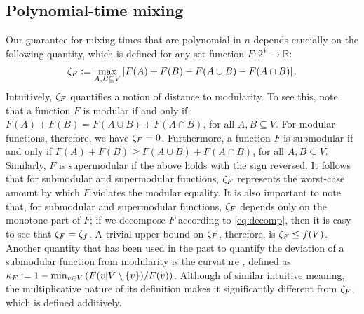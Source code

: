 %
\subsection{Polynomial-time mixing} \label{sect:poly}
Our guarantee for mixing times that are polynomial in $n$ depends crucially on the following quantity, which is defined for any set function $F : 2^V \to \mathbb{R}$:
\begin{align*}
  \zeta_F \vcentcolon= \max_{A, B \subseteq V} \left|F(A) + F(B) - F(A \cup B) - F(A \cap B) \right|.
\end{align*}
Intuitively, $\zeta_F$ quantifies a notion of distance to modularity.
To see this, note that a function $F$ is modular if and only if $F(A) + F(B) = F(A \cup B) + F(A \cap B)$, for all $A, B \subseteq V$.
For modular functions, therefore, we have $\zeta_F = 0$.
Furthermore, a function $F$ is submodular if and only if $F(A) + F(B) \geq F(A \cup B) + F(A \cap B)$, for all $A, B \subseteq V$.
Similarly, $F$ is supermodular if the above holds with the sign reversed.
It follows that for submodular and supermodular functions, $\zeta_F$ represents the worst-case amount by which $F$ violates the modular equality.
It is also important to note that, for submodular and supermodular functions, $\zeta_F$ depends only on the monotone part of $F$; if we decompose $F$ according to \eqref{eq:decomp}, then it is easy to see that $\zeta_F = \zeta_f$.
A trivial upper bound on $\zeta_F$, therefore, is $\zeta_F \leq f(V)$.
Another quantity that has been used in the past to quantify the deviation of a submodular function from modularity is the curvature \cite{conforti84}, defined as $\kappa_F \vcentcolon= 1 - \min_{v \in V} \left(F(v|V\setminus\{v\}) / F(v)\right)$.
Although of similar intuitive meaning, the multiplicative nature of its definition makes it significantly different from $\zeta_F$, which is defined additively.

